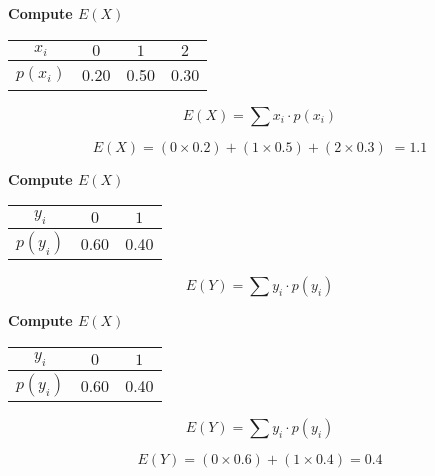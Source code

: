\documentclass[a4paper,12pt]{article}
\begin{document}
\medskip 

\large

\noindent \textbf{Compute $E(X)$}
\begin{center}
\begin{tabular}{|c|c|c|c|}
\hline $x_i$ & $0$ & $1$ & $2$  \\ 
\hline $p(x_i)$& 0.20 & 0.50 & 0.30 \\
\hline 
\end{tabular} 
\end{center}

\[ E(X) =  \sum  x_i \cdot p(x_i)   \]

\[E(X) =(0\times 0.2) + (1 \times 0.5) + (2 \times 0.3)\;  = 1.1\]



\medskip 

\large

\noindent \textbf{Compute $E(X)$}
\begin{center}
\begin{tabular}{|c|c|c|}
\hline $y_i$ & $0$ & $1$  \\ 
\hline $p(y_i)$& 0.60 & 0.40 \\
\hline 
\end{tabular} 
\end{center}

\[ E(Y) =  \sum  y_i \cdot p(y_i)   \]




\medskip 

\large

\noindent \textbf{Compute $E(X)$}
\begin{center}
\begin{tabular}{|c|c|c|}
\hline $y_i$ & $0$ & $1$  \\ 
\hline $p(y_i)$& 0.60 & 0.40 \\
\hline 
\end{tabular} 
\end{center}

\[ E(Y) =  \sum  y_i \cdot p(y_i)   \]

\[ E(Y) = (0 \times 0.6) +  (1 \times 0.4)  =0.4 \]
\end{document}
